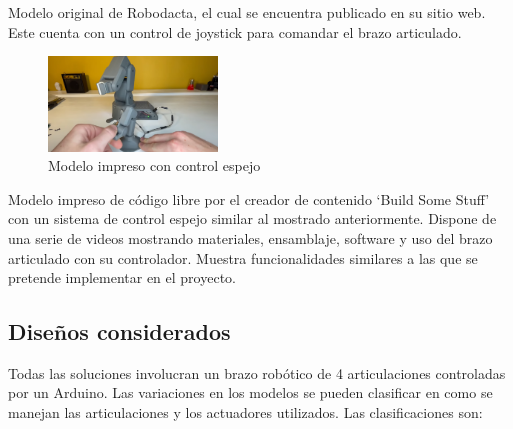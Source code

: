 \begin{multicols}{2}
Modelo original de Robodacta, el cual se encuentra publicado en su sitio web. Este cuenta con un control de joystick para comandar el brazo articulado.

\begin{figure}[H]
  \centering
  \includegraphics[width=0.4\textwidth]{anexos/inspiraciones/10impreso.png}
  \caption{Modelo impreso con control espejo~\cite{youtube_robot_arm_mirror}}\label{fig:insp.impreso}
\end{figure}

Modelo impreso de código libre por el creador de contenido `Build Some Stuff' con un sistema de control espejo similar al mostrado anteriormente. Dispone de una serie de videos mostrando materiales, ensamblaje, software y uso del brazo articulado con su controlador. Muestra funcionalidades similares a las que se pretende implementar en el proyecto.

\end{multicols}

\subsection{Diseños considerados}
Todas las soluciones involucran un brazo robótico de 4 articulaciones controladas por un Arduino. Las variaciones en los modelos se pueden clasificar en como se manejan las articulaciones y los actuadores utilizados. Las clasificaciones son:

